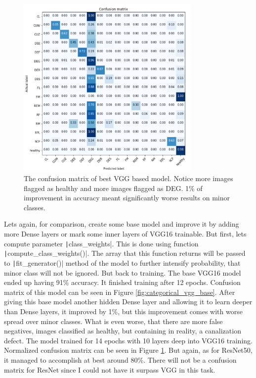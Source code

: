 \documentclass[thesis=B,english]{FITthesis}[2019/12/23]
\begin{document}
\begin{figure}
    \centering
    \includegraphics[width=0.8\textwidth]{CategoricalVGGTuned.PNG}
    \caption[Confusion matrix of tuned VGG]{The confusion matrix of best VGG based model. Notice more images flagged as healthy and more images flagged as DEG. 1\% of improvement in accuracy meant significantly worse results on minor classes.}
    \label{fig:categorical_vgg_tuned}
\end{figure}

Lets again, for comparison, create some base model and improve it by adding more Dense layers or mark some inner layers of VGG16 trainable. But first, lets compute parameter \texttt|class_weights|. This is done using function \texttt|compute_class_weights()|. The array that this function returns will be passed to \texttt|fit_generator()| method of the model to further intensify probability, that minor class will not be ignored. But back to training. The base VGG16 model ended up having 91\% accuracy. It finished training after 12 epochs. Confusion matrix of this model can be seen in Figure \ref{fig:categorical_vgg_base}. After giving this base model another hidden Dense layer and allowing it to learn deeper than Dense layers, it improved by 1\%, but this improvement comes with worse spread over minor classes. What is even worse, that there are more false negatives, images classified as healthy, but containing in reality, a canalization defect. The model trained for 14 epochs with 10 layers deep into VGG16 training. Normalized confusion matrix can be seen in Figure \ref{fig:categorical_vgg_tuned}. But again, as for ResNet50, it managed to accomplish at best around 80\%. There will not be a confusion matrix for ResNet since I could not have it surpass VGG in this task.
\end{document}
